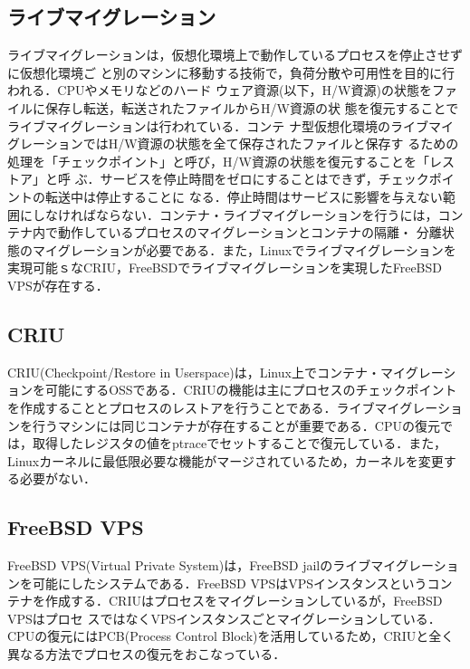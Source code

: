 \documentclass[11pt]{jarticle}
\begin{document}
\subsection{ライブマイグレーション}

ライブマイグレーションは，仮想化環境上で動作しているプロセスを停止させずに仮想化環境ご
と別のマシンに移動する技術で，負荷分散や可用性を目的に行われる．CPUやメモリなどのハード
ウェア資源(以下，H/W資源)の状態をファイルに保存し転送，転送されたファイルからH/W資源の状
態を復元することでライブマイグレーションは行われている\cite{yamada_survey_2016}．コンテ
ナ型仮想化環境のライブマイグレーションではH/W資源の状態を全て保存されたファイルと保存す
るための処理を「チェックポイント」と呼び，H/W資源の状態を復元することを「レストア」と呼
ぶ．サービスを停止時間をゼロにすることはできず，チェックポイントの転送中は停止することに
なる．停止時間はサービスに影響を与えない範囲にしなければならない．コンテナ・ライブマイグレーションを行うには，コンテナ内で動作しているプロセスのマイグレーションとコンテナの隔離・
分離状態のマイグレーションが必要である．また，Linuxでライブマイグレーションを実現可能ｓなCRIU，FreeBSDでライブマイグレーションを実現したFreeBSD VPSが存在する．

\subsection{CRIU}
\label{sec:CRIU}
CRIU(Checkpoint/Restore in Userspace)は，Linux上でコンテナ・マイグレーションを可能にするOSSである．CRIUの機能は主にプロセスのチェックポイントを作成することとプロセスのレストアを行うことである．ライブマイグレーションを行うマシンには同じコンテナが存在することが重要である．CPUの復元では，取得したレジスタの値をptraceでセットすることで復元している．また，Linuxカーネルに最低限必要な機能がマージされているため，カーネルを変更する必要がない．

\subsection{FreeBSD VPS}
\label{sec:FreeBSD VPS}
FreeBSD VPS(Virtual Private System)は，FreeBSD jailのライブマイグレーションを可能にしたシステムである．FreeBSD VPSはVPSインスタンスというコンテナを作成する．CRIUはプロセスをマイグレーションしているが，FreeBSD VPSはプロセ
スではなくVPSインスタンスごとマイグレーションしている．CPUの復元にはPCB(Process Control Block)を活用しているため，CRIUと全く異なる方法でプロセスの復元をおこなっている．
\end{document}
